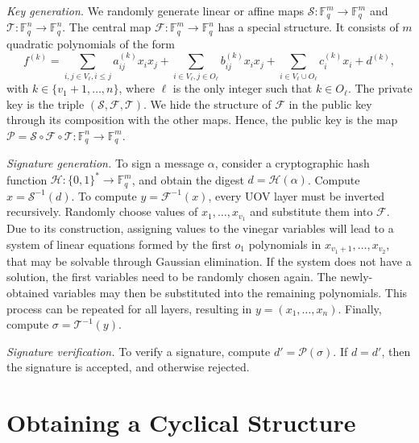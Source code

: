 \documentclass[a4paper, 14pt]{extarticle}
\begin{document}
\emph{Key generation.} We randomly generate linear or affine maps $\mathcal{S}: \mathbb{F}_{q}^{m} \rightarrow \mathbb{F}_{q}^{m}$ and $\mathcal{T}: \mathbb{F}_{q}^{n} \rightarrow \mathbb{F}_{q}^{n}$. The central map $\mathcal{F}: \mathbb{F}_{q}^{m} \rightarrow \mathbb{F}_{q}^{n}$
has a special structure. It consists of $m$ quadratic polynomials of the form
\begin{equation}\label{eq:0}
f^{(k)} = \sum_{i, j \in V_{\ell}, i \leq j} a_{ij}^{(k)} x_{i} x_{j}
        + \sum_{i \in V_{\ell}, j \in O_{\ell}} b_{ij}^{(k)} x_{i} x_{j}
        + \sum_{i \in V_{\ell} \cup O_{\ell}} c_{i}^{(k)} x_{i} + d^{(k)},
\end{equation}
with $k \in \{v_{1} + 1, \dots, n\}$, where $\ell$ is the only integer such that $k \in O_{\ell}$. The private key is the triple $(\mathcal{S}, \mathcal{F}, \mathcal{T})$. We hide the structure of $\mathcal{F}$ in the public key through its composition with the other maps. Hence, the public key is the map $\mathcal{P} = \mathcal{S} \circ \mathcal{F} \circ \mathcal{T} : \mathbb{F}_{q}^{n} \rightarrow \mathbb{F}_{q}^{m}$.

\emph{Signature generation.} To sign a message $\alpha$, consider a cryptographic hash function $\mathcal{H} : \{0, 1\}^{*} \rightarrow \mathbb{F}_{q}^{m}$, and obtain the digest $d = \mathcal{H}(\alpha)$. Compute $x = \mathcal{S}^{-1}(d)$. To compute $y = \mathcal{F}^{-1}(x)$, every UOV layer must be inverted recursively. Randomly choose values of $x_{1}, \dots, x_{v_{1}}$ and substitute them into $\mathcal{F}$. Due to its construction, assigning values to the vinegar variables will lead to a system of linear equations formed by the first $o_{1}$ polynomials in $x_{v_{1} + 1}, \dots, x_{v_{2}}$, that may be solvable through Gaussian elimination. If the system does not have a solution, the first variables need to be randomly chosen again. The newly-obtained variables may then be substituted into the remaining polynomials. This process can be repeated for all layers, resulting in $y = (x_{1}, \dots, x_{n})$. Finally, compute $\sigma = \mathcal{T}^{-1}(y)$.

\emph{Signature verification.} To verify a signature, compute $d' = \mathcal{P}(\sigma)$. If $d = d'$, then the signature is accepted, and otherwise rejected.

\section{Obtaining a Cyclical Structure}\label{sec:cyclic}
\end{document}
